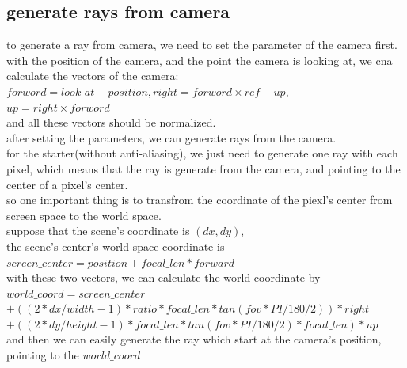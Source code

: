 \documentclass[acmtog]{acmart}
\begin{document}
\subsection{generate rays from camera}
to generate a ray from camera, we need to set the parameter of the camera first.\\
with the position of the camera, and the point the camera is looking at, we cna calculate the vectors of the camera:\\
$forword = look\_at - position, right = forword \times ref-up, $\\ $up = right \times forword$\\
and all these vectors should be normalized.\\
after setting the parameters, we can generate rays from the camera.\\
for the starter(without anti-aliasing), we just need to generate one ray with each pixel, which means that the ray is generate from the camera, and pointing to the center of a pixel's center.\\
so one important thing is to transfrom the coordinate of the piexl's center from screen space to the world space.\\
suppose that the scene's coordinate is $(dx,dy)$,\\
the scene's center's world space coordinate is $screen\_center = position + focal\_len * forward$\\
with these two vectors, we can calculate the world coordinate by 
$world\_coord = screen\_center$\\
              $+ ((2 * dx / width - 1) * ratio * focal\_len * tan(fov * PI / 180 / 2)) * right$\\
              $+ ((2 * dy / height - 1) * focal\_len * tan(fov * PI / 180 / 2) * focal\_len) * up$\\
and then we can easily generate the ray which start at the camera's position, pointing to the $world\_coord$
\end{document}
